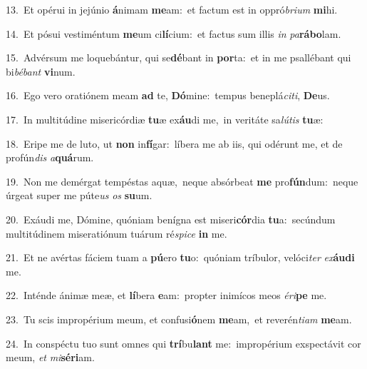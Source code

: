 {\numbfont\textcolor{\numbcolor}{13.}}~Et opérui in jejúnio \textbf{á}\-nimam \textbf{me}\-am:~\star et factum est in oppró\-\textit{bri}\-\textit{um} \textbf{mi}\-hi.\par
{\numbfont\textcolor{\numbcolor}{14.}}~Et pósui vestiméntum \textbf{me}\-um ci\-\textbf{lí}\-cium:~\star et factus sum illis \textit{in} \textit{pa}\-\textbf{rá}\textbf{bo}lam.\par
{\numbfont\textcolor{\numbcolor}{15.}}~Advérsum me loquebántur, qui se\-\textbf{dé}\-bant in \textbf{por}\-ta:~\star et in me psallébant qui bi\-\textit{bé}\-\textit{bant} \textbf{vi}\-num.\par
{\numbfont\textcolor{\numbcolor}{16.}}~Ego vero oratiónem meam \textbf{ad} te, \textbf{Dó}\-mine:~\star tempus beneplá\-\textit{ci}\-\textit{ti}, \textbf{De}\-us.\par
{\numbfont\textcolor{\numbcolor}{17.}}~In multitúdine misericórdiæ \textbf{tu}\-æ ex\-\textbf{áu}\-di me,~\star in veritáte sa\-\textit{lú}\-\textit{tis} \textbf{tu}\-æ:\par
{\numbfont\textcolor{\numbcolor}{18.}}~Eripe me de luto, ut \textbf{non} in\-\textbf{fí}\-gar:~\star líbera me ab iis, qui odérunt me, et de profún\textit{dis} \textit{a}\-\textbf{quá}rum.\par
{\numbfont\textcolor{\numbcolor}{19.}}~Non me demérgat tempéstas aquæ,~\dagger neque absórbeat \textbf{me} pro\-\textbf{fún}\-dum:~\star neque úrgeat super me púte\textit{us} \textit{os} \textbf{su}\-um.\par
{\numbfont\textcolor{\numbcolor}{20.}}~Exáudi me, Dómine, quóniam benígna est miseri\-\textbf{cór}\-dia \textbf{tu}\-a:~\star secúndum multitúdinem miseratiónum tuárum ré\-\textit{spi}\-\textit{ce} \textbf{in} me.\par
{\numbfont\textcolor{\numbcolor}{21.}}~Et ne avértas fáciem tuam a \textbf{pú}\-ero \textbf{tu}\-o:~\star quóniam tríbulor, velóci\textit{ter} \textit{ex}\-\textbf{áu}\textbf{di} me.\par
{\numbfont\textcolor{\numbcolor}{22.}}~Inténde ánimæ meæ, et \textbf{lí}\-bera \textbf{e}\-am:~\star propter inimícos meos \textit{é}\-\textit{ri}\textbf{pe} me.\par
{\numbfont\textcolor{\numbcolor}{23.}}~Tu scis impropérium meum, et confusi\-\textbf{ó}\-nem \textbf{me}\-am,~\star et reverén\-\textit{ti}\-\textit{am} \textbf{me}\-am.\par
{\numbfont\textcolor{\numbcolor}{24.}}~In conspéctu tuo sunt omnes qui \textbf{trí}\-bu\textbf{lant} me:~\star impropérium exspectávit cor meum, \textit{et} \textit{mi}\-\textbf{sé}\textbf{ri}am.\par
